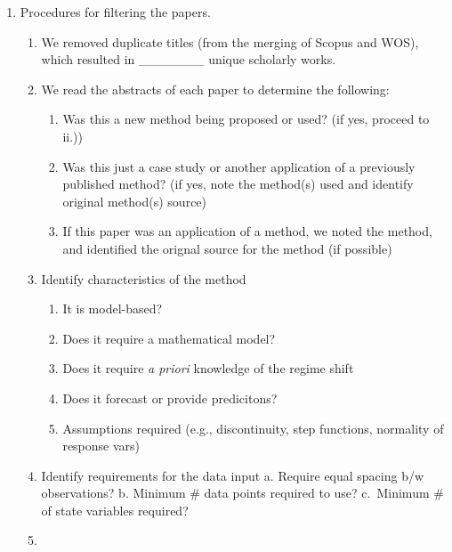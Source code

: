\documentclass[12pt,twoside]{reedthesis}
\providecommand{\tightlist}{%
  \setlength{\itemsep}{0pt}\setlength{\parskip}{0pt}}
\def\labelenumi{\arabic{enumi}.}
\def\labelenumi{\arabic{enumi}.}
\begin{document}
\begin{enumerate}
\def\labelenumi{\arabic{enumi}.}
\setcounter{enumi}{1}
\tightlist
\item
  Procedures for filtering the papers.
  \begin{enumerate}
  \def\labelenumii{\roman{enumii}.}
  \tightlist
  \item
    We removed duplicate titles (from the merging of Scopus and WOS), which resulted in \_\_\_\_\_\_\_ unique scholarly works.\\
  \item
    We read the abstracts of each paper to determine the following:
    \begin{enumerate}
    \def\labelenumiii{\alph{enumiii}.}
    \tightlist
    \item
      Was this a new method being proposed or used? (if yes, proceed to ii.))\\
    \item
      Was this just a case study or another application of a previously published method? (if yes, note the method(s) used and identify original method(s) source)\\
    \item
      If this paper was an application of a method, we noted the method, and identified the orignal source for the method (if possible)\\
    \end{enumerate}
  \item
    Identify characteristics of the method
    \begin{enumerate}
    \def\labelenumiii{\alph{enumiii}.}
    \setcounter{enumiii}{2}
    \tightlist
    \item
      It is model-based?\\
    \item
      Does it require a mathematical model?
    \item
      Does it require \emph{a priori} knowledge of the regime shift
    \item
      Does it forecast or provide predicitons?
    \item
      Assumptions required (e.g., discontinuity, step functions, normality of response vars)
    \end{enumerate}
  \item
    Identify requirements for the data input
    a. Require equal spacing b/w observations?
    b. Minimum \# data points required to use?
    c.~Minimum \# of state variables required?
  \item

\end{enumerate}
\end{enumerate}
\end{document}
